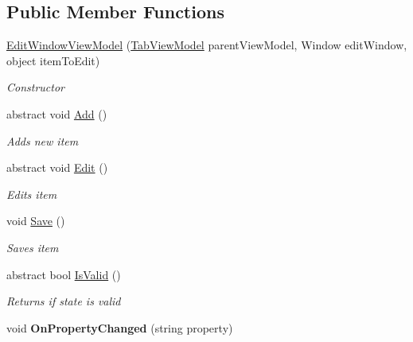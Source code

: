\subsection*{Public Member Functions}
\begin{DoxyCompactItemize}
\item 
\hyperlink{class_baudi_1_1_client_1_1_view_models_1_1_edit_window_view_models_1_1_edit_window_view_model_a9b5dcfc94184626239f08739fcc085dd}{Edit\+Window\+View\+Model} (\hyperlink{class_baudi_1_1_client_1_1_view_models_1_1_tabs_view_models_1_1_tab_view_model}{Tab\+View\+Model} parent\+View\+Model, Window edit\+Window, object item\+To\+Edit)
\begin{DoxyCompactList}\small\item\em Constructor \end{DoxyCompactList}\item 
abstract void \hyperlink{class_baudi_1_1_client_1_1_view_models_1_1_edit_window_view_models_1_1_edit_window_view_model_ae2b6299daeb59ecad919403e309ad933}{Add} ()
\begin{DoxyCompactList}\small\item\em Adds new item \end{DoxyCompactList}\item 
abstract void \hyperlink{class_baudi_1_1_client_1_1_view_models_1_1_edit_window_view_models_1_1_edit_window_view_model_a9f08bfa6312dcb7f68fd916a7d185ee0}{Edit} ()
\begin{DoxyCompactList}\small\item\em Edits item \end{DoxyCompactList}\item 
void \hyperlink{class_baudi_1_1_client_1_1_view_models_1_1_edit_window_view_models_1_1_edit_window_view_model_a2d35eca0aa3eae7d415b839d67cd6e90}{Save} ()
\begin{DoxyCompactList}\small\item\em Saves item \end{DoxyCompactList}\item 
abstract bool \hyperlink{class_baudi_1_1_client_1_1_view_models_1_1_edit_window_view_models_1_1_edit_window_view_model_aeae328bfe7608e01ce3c54da0c13f781}{Is\+Valid} ()
\begin{DoxyCompactList}\small\item\em Returns if state is valid \end{DoxyCompactList}\item 
\hypertarget{class_baudi_1_1_client_1_1_view_models_1_1_edit_window_view_models_1_1_edit_window_view_model_abd4c46faa4ea8a7fc0c0a5a3a098057c}{}void {\bfseries On\+Property\+Changed} (string property)\label{class_baudi_1_1_client_1_1_view_models_1_1_edit_window_view_models_1_1_edit_window_view_model_abd4c46faa4ea8a7fc0c0a5a3a098057c}

\end{DoxyCompactItemize}
